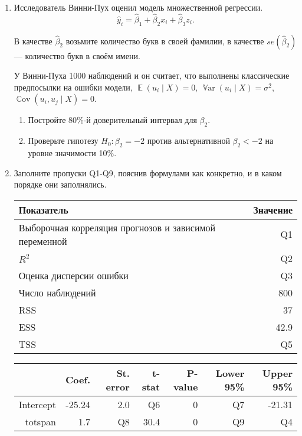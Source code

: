 \documentclass[12pt]{article}
\DeclareMathOperator{\Cov}{\mathbb{C}ov}
\DeclareMathOperator{\E}{\mathbb{E}}
\DeclareMathOperator{\Var}{\mathbb{V}ar}
\begin{document}
\newpage
\begin{enumerate}
    \item Исследователь Винни-Пух оценил модель множественной регрессии.
    \[
    \hat y_i = \hat\beta_1 + \hat\beta_2 x_i + \hat\beta_3 z_i.
    \]

    В качестве $\hat\beta_2$ возьмите количество букв в своей фамилии,
    в качестве $se(\hat\beta_2)$ — количество букв в своём имени. 

    У Винни-Пуха 1000 наблюдений и он считает, что выполнены классические предпосылки 
    на ошибки модели, $\E(u_i \mid X) = 0$, $\Var(u_i \mid X) = \sigma^2$, 
    $\Cov(u_i, u_j \mid X) = 0$.


    \begin{enumerate}
        \item Постройте 80\%-й доверительный интервал для $\beta_2$.
        \item Проверьте гипотезу $H_0: \beta_2 = -2$ против альтернативной 
        $\beta_2 < -2$ на уровне значимости 10\%.
    \end{enumerate}

    \item Заполните пропуски Q1-Q9, пояснив формулами как конкретно, и в каком порядке они заполнялись.
    
    \begin{tabular}{lr} \toprule
    Показатель & Значение \\
    \midrule
    Выборочная корреляция прогнозов и зависимой переменной  & Q1 \\
    $R^2$     			& Q2 \\
    Оценка дисперсии ошибки 		& Q3 \\
    Число наблюдений		& 800 \\
    RSS & 37 \\
    ESS & 42.9 \\
    TSS & Q5 \\
    \bottomrule
    \end{tabular}


    \begin{tabular}{rrrrrrr}
    \toprule
                 & Coef. 	& St. error	& t-stat & P-value	& Lower 95\% 	& Upper 95\% \\
    \midrule
    Intercept 	& -25.24 	& 2.0 	& Q6 		& 0 	&  Q7		& -21.31 \\
    totspan		& 1.7		& Q8    & 30.4 	    & 0 	&  Q9	    & Q4 \\
    \bottomrule
    \end{tabular}
    

\end{enumerate}
\end{document}

